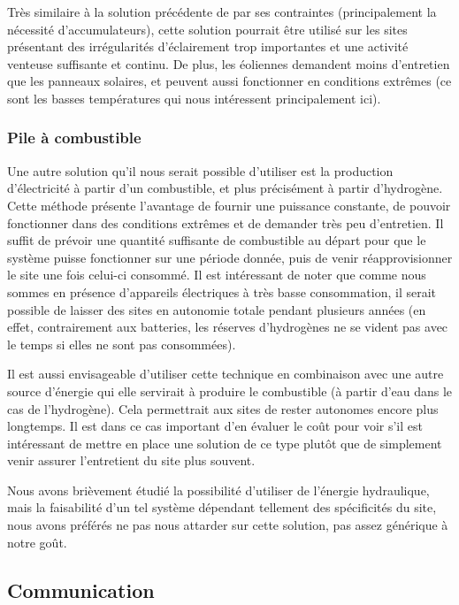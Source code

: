 Très similaire à la solution précédente de par ses contraintes (principalement la nécessité d'accumulateurs), cette solution pourrait être utilisé sur les sites présentant des irrégularités d'éclairement trop importantes et une activité venteuse suffisante et continu. De plus, les éoliennes demandent moins d'entretien que les panneaux solaires, et peuvent aussi fonctionner en conditions extrêmes (ce sont les basses températures qui nous intéressent principalement ici).

\subsubsection{Pile à combustible}

Une autre solution qu'il nous serait possible d'utiliser est la production d'électricité à partir d'un combustible, et plus précisément à partir d'hydrogène. Cette méthode présente l'avantage de fournir une puissance constante, de pouvoir fonctionner dans des conditions extrêmes et de demander très peu d'entretien. Il suffit de prévoir une quantité suffisante de combustible au départ pour que le système puisse fonctionner sur une période donnée, puis de venir réapprovisionner le site une fois celui-ci consommé. Il est intéressant de noter que comme nous sommes en présence d'appareils électriques à très basse consommation, il serait possible de laisser des sites en autonomie totale pendant plusieurs années (en effet, contrairement aux batteries, les réserves d'hydrogènes ne se vident pas avec le temps si elles ne sont pas consommées).

Il est aussi envisageable d'utiliser cette technique en combinaison avec une autre source d'énergie qui elle servirait à produire le combustible (à partir d'eau dans le cas de l'hydrogène). Cela permettrait aux sites de rester autonomes encore plus longtemps. Il est dans ce cas important d'en évaluer le coût pour voir s'il est intéressant de mettre en place une solution de ce type plutôt que de simplement venir assurer l'entretient du site plus souvent.

Nous avons brièvement étudié la possibilité d'utiliser de l'énergie hydraulique, mais la faisabilité d'un tel système dépendant tellement des spécificités du site, nous avons préférés ne pas nous attarder sur cette solution, pas assez générique à notre goût.

\subsection{Communication}

